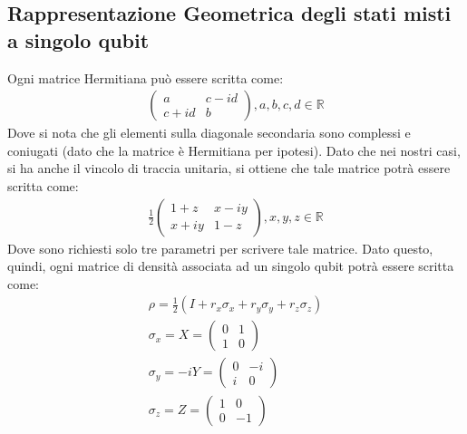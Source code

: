 \subsection{Rappresentazione Geometrica degli stati misti a singolo qubit}
Ogni matrice Hermitiana può essere scritta come:
\begin{gather*}
    \left(\begin{smallmatrix}
        a & c-id\\
        c+id & b
    \end{smallmatrix}\right), a,b,c,d \in \mathbb{R}
\end{gather*}
Dove si nota che gli elementi sulla diagonale secondaria sono complessi e coniugati (dato che la matrice è Hermitiana per ipotesi). Dato che nei nostri casi, si ha anche il vincolo di traccia unitaria, si ottiene che tale matrice potrà essere scritta come:
\begin{gather*}
    \frac{1}{2}
    \left(\begin{smallmatrix}
    1 + z & x-iy \\
    x + iy & 1 - z    
    \end{smallmatrix}\right), x,y,z \in \mathbb{R}
\end{gather*}
Dove sono richiesti solo tre parametri per scrivere tale matrice. Dato questo, quindi, ogni matrice di densità associata ad un singolo qubit potrà essere scritta come:
\begin{gather*}
    \rho = \frac{1}{2}(I + r_x \sigma_x + r_y \sigma_y + r_z \sigma_z)\\
    \sigma_x = X = \left(\begin{smallmatrix}
        0 & 1 \\
        1 & 0
    \end{smallmatrix}\right)\\
    \sigma_y = -iY = \left(\begin{smallmatrix}
        0 & -i \\
        i & 0
    \end{smallmatrix}\right)\\
    \sigma_z = Z = \left(\begin{smallmatrix}
        1 & 0 \\
        0 & -1
    \end{smallmatrix}\right)
\end{gather*}


